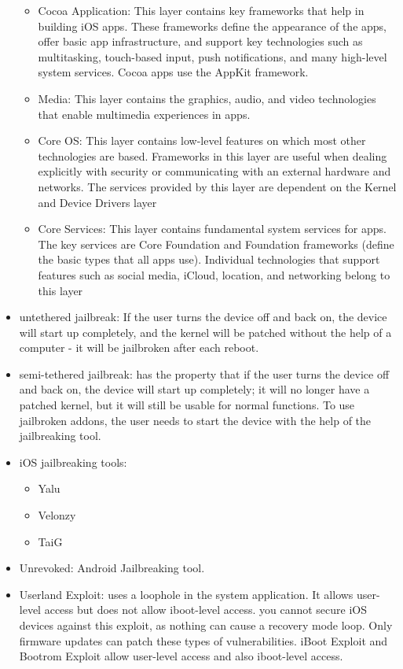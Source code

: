 \begin{itemize}
    \begin{itemize}
        \item Cocoa Application: This layer contains key frameworks that help in building iOS apps. These frameworks define the appearance of the apps, offer basic app infrastructure, and support key technologies such as multitasking, touch-based input, push notifications, and many high-level system services. Cocoa apps use the AppKit framework.
        \item Media: This layer contains the graphics, audio, and video technologies that enable multimedia experiences in apps.
        \item Core OS: This layer contains low-level features on which most other technologies are based. Frameworks in this layer are useful when dealing explicitly with security or communicating with an external hardware and networks. The services provided by this layer are dependent on the Kernel and Device Drivers layer
        \item Core Services: This layer contains fundamental system services for apps. The key services are Core Foundation and Foundation frameworks (define the basic types that all apps use). Individual technologies that support features such as social media, iCloud, location, and networking belong to this layer
    \end{itemize}
    \item untethered jailbreak: If the user turns the device off and back on, the device will start up completely, and the kernel will be patched without the help of a computer - it will be jailbroken after each reboot.
    \item semi-tethered jailbreak: has the property that if the user turns the device off and back on, the device will start up completely; it will no longer have a patched kernel, but it will still be usable for normal functions. To use jailbroken addons, the user needs to start the device with the help of the jailbreaking tool.
    \item iOS jailbreaking tools:
    \begin{itemize}
        \item Yalu
        \item Velonzy
        \item TaiG
    \end{itemize}
    \item Unrevoked: Android Jailbreaking tool.
    \item Userland Exploit: uses a loophole in the system application. It allows user-level access but does not allow iboot-level access. you cannot secure iOS devices against this exploit, as nothing can cause a recovery mode loop. Only firmware updates can patch these types of vulnerabilities. iBoot Exploit and Bootrom Exploit allow user-level access and also iboot-level access.
\end{itemize}
